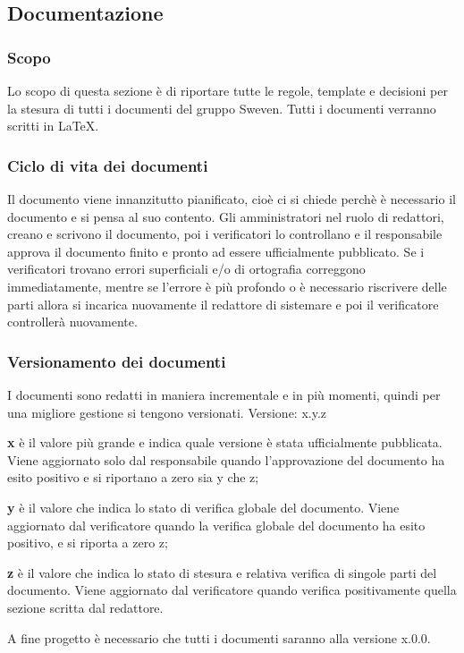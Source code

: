 \subsection{Documentazione}
\subsubsection{Scopo}
Lo scopo di questa sezione è di riportare tutte le regole, template e decisioni 
per la stesura di tutti i documenti del gruppo Sweven. \newline
Tutti i documenti verranno scritti in \LaTeX.

\subsubsection{Ciclo di vita dei documenti}
Il documento viene innanzitutto pianificato, cioè ci si chiede perchè è necessario il documento
e si pensa al suo contento. Gli amministratori nel ruolo di redattori, creano e scrivono 
il documento, poi i verificatori lo controllano e il responsabile approva il documento 
finito e pronto ad essere ufficialmente pubblicato. \newline
Se i verificatori trovano errori superficiali e/o di ortografia correggono immediatamente,
mentre se l'errore è più profondo o è necessario riscrivere delle parti allora si
incarica nuovamente il redattore di sistemare e poi il verificatore controllerà nuovamente.

\subsubsection{Versionamento dei documenti}
I documenti sono redatti in maniera incrementale e in più momenti, quindi per una migliore 
gestione si tengono versionati.
\newline Versione: x.y.z
\begin{description}
    \item \textbf{x} è il valore più grande e indica quale versione è stata ufficialmente pubblicata.
            Viene aggiornato solo dal responsabile quando l'approvazione del documento ha esito positivo
            e si riportano a zero sia y che z;
    \item \textbf{y} è il valore che indica lo stato di verifica globale del documento. Viene aggiornato dal verificatore 
            quando la verifica globale del documento ha esito positivo, e si riporta a zero z;
    \item \textbf{z} è il valore che indica lo stato di stesura e relativa verifica di singole parti del documento. 
            Viene aggiornato dal verificatore quando verifica positivamente quella sezione scritta dal redattore.
\end{description}
A fine progetto è necessario che tutti i documenti saranno alla versione x.0.0.


